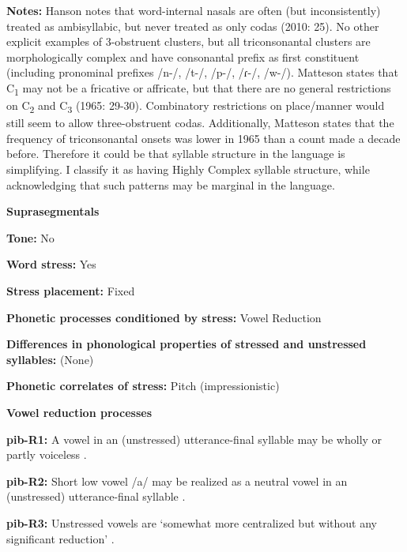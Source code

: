 \textbf{Notes:} Hanson notes that word-internal nasals are often (but inconsistently) treated as ambisyllabic, but never treated as only codas (2010: 25). No other explicit examples of 3-obstruent clusters, but all triconsonantal clusters are morphologically complex and have consonantal prefix as first constituent (including pronominal prefixes /n-/, /t-/, /p-/, /ɾ{}-/, /w-/). Matteson states that C\textsubscript{1} may not be a fricative or affricate, but that there are no general restrictions on C\textsubscript{2} and C\textsubscript{3} (1965: 29-30). Combinatory restrictions on place/manner would still seem to allow three-obstruent codas. Additionally, Matteson states that the frequency of triconsonantal onsets was lower in 1965 than a count made a decade before. Therefore it could be that syllable structure in the language is simplifying. I classify it as having Highly Complex syllable structure, while acknowledging that such patterns may be marginal in the language.



\textbf{Suprasegmentals}



\textbf{Tone:} No



\textbf{Word stress:} Yes



\textbf{Stress placement:} Fixed



\textbf{Phonetic processes conditioned by stress:} Vowel Reduction



\textbf{Differences in phonological properties of stressed and unstressed syllables:} (None)



\textbf{Phonetic correlates of stress:} Pitch (impressionistic)



\textbf{Vowel reduction processes}



\textbf{pib-R1:} A vowel in an (unstressed) utterance-final syllable may be wholly or partly voiceless \citep[23]{Matteson1965}.



\textbf{pib-R2:} Short low vowel /a/ may be realized as a neutral vowel in an (unstressed) utterance-final syllable \citep[23]{Matteson1965}.



\textbf{pib-R3:} Unstressed vowels are ‘somewhat more centralized but without any significant reduction’ \citep[16]{Hanson2010}.



